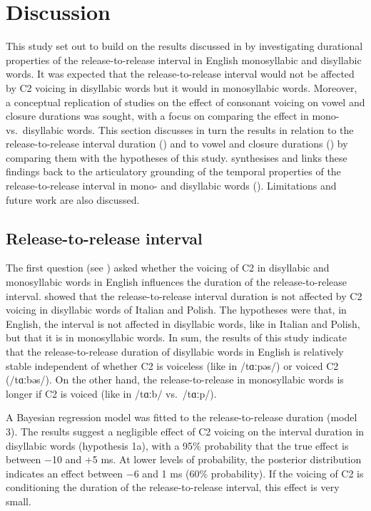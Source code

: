 \documentclass[
  12pt,
  a4paper,
]{article}
\begin{document}
\hypertarget{discussion}{%
\section{Discussion}\label{discussion}}

This study set out to build on the results discussed in
\citet{coretta2018j} by investigating durational properties of the
release-to-release interval in English monosyllabic and disyllabic
words. It was expected that the release-to-release interval would not be
affected by C2 voicing in disyllabic words but it would in monosyllabic
words. Moreover, a conceptual replication of studies on the effect of
consonant voicing on vowel and closure durations was sought, with a
focus on comparing the effect in mono- vs.~disyllabic words. This
section discusses in turn the results in relation to the
release-to-release interval duration () and to vowel and
closure durations () by comparing them with the
hypotheses of this study.  synthesises and links these
findings back to the articulatory grounding of the temporal properties
of the release-to-release interval in mono- and disyllabic words
(). Limitations and future work are also discussed.

\hypertarget{release-to-release-interval}{%
\subsection{Release-to-release
interval}\label{release-to-release-interval}}

\label{s:rr-disc}

The first question (see ) asked whether the voicing of C2
in disyllabic and monosyllabic words in English influences the duration
of the release-to-release interval. \citet{coretta2018j} showed that the
release-to-release interval duration is not affected by C2 voicing in
disyllabic words of Italian and Polish. The hypotheses were that, in
English, the interval is not affected in disyllabic words, like in
Italian and Polish, but that it is in monosyllabic words. In sum, the
results of this study indicate that the release-to-release duration of
disyllabic words in English is relatively stable independent of whether
C2 is voiceless (like in /tɑːpəs/) or voiced C2 (/tɑːbəs/). On the other
hand, the release-to-release in monosyllabic words is longer if C2 is
voiced (like in /tɑːb/ vs.~/tɑːp/).

A Bayesian regression model was fitted to the release-to-release
duration (model 3). The results suggest a negligible effect of C2
voicing on the interval duration in disyllabic words (hypothesis 1a),
with a 95\% probability that the true effect is between −10 and +5 ms.
At lower levels of probability, the posterior distribution indicates an
effect between −6 and 1 ms (60\% probability). If the voicing of C2 is
conditioning the duration of the release-to-release interval, this
effect is very small.
\end{document}
